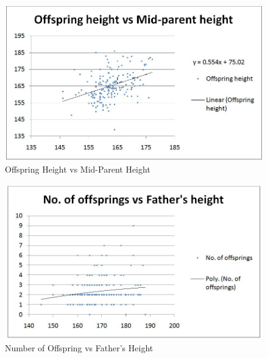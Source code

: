 \begin{figure}[bth]
	\begin{center}
		\includegraphics[width=1.1\linewidth]{gfx/Heritability_of_height}
	\end{center}
\caption[Offspring Height vs Mid-Parent Height]{Offspring Height vs Mid-Parent Height}
\label{human_midparent}
\end{figure}

\begin{figure}[bth]
	\begin{center}
		\includegraphics[width=1.1\linewidth]{gfx/Fitness_father}
	\end{center}
\caption[Number of Offspring vs Father's Height]{Number of Offspring vs Father's Height}
\label{human_father}
\end{figure}

